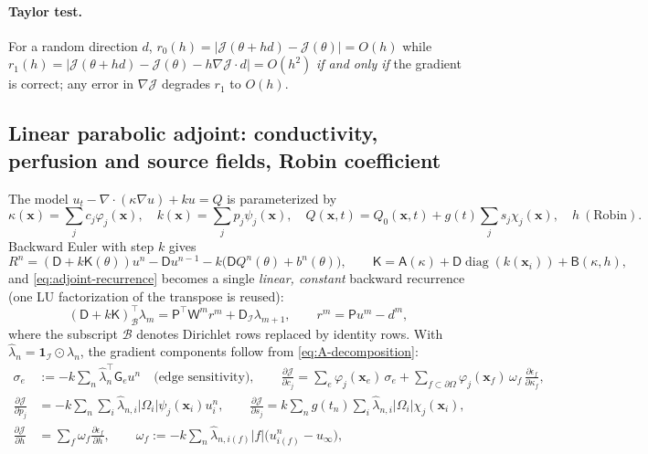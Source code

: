 \documentclass[11pt]{article}
\numberwithin{equation}{section}
\theoremstyle{remark}
\newcommand{\Dm}{\mathsf{D}}           %
\newcommand{\K}{\mathsf{K}}
\newcommand{\Pobs}{\mathsf{P}}
\begin{document}
\paragraph{Taylor test.}  For a random direction $d$,
$r_0(h)=|\mathcal J(\theta+hd)-\mathcal J(\theta)|=O(h)$ while
$r_1(h)=|\mathcal J(\theta+hd)-\mathcal J(\theta)-h\nabla\mathcal J\cdot d|=O(h^2)$
\emph{if and only if} the gradient is correct; any error in $\nabla\mathcal J$
degrades $r_1$ to $O(h)$.

\subsection{Linear parabolic adjoint: conductivity, perfusion and source fields, Robin coefficient}
\label{sec:linear-adjoint}

The model $u_t-\nabla\cdot(\kappa\nabla u)+ku=Q$ is parameterized by
\begin{equation}
  \kappa(\bm x)=\sum_{j}c_j\varphi_j(\bm x),\quad
  k(\bm x)=\sum_j p_j\psi_j(\bm x),\quad
  Q(\bm x,t)=Q_0(\bm x,t)+g(t)\sum_j s_j\chi_j(\bm x),\quad h\ (\text{Robin}).
\end{equation}
Backward Euler with step $k$ gives
\begin{equation}
  R^n = (\Dm+k\K(\theta))u^n-\Dm u^{n-1}-k\big(\Dm Q^n(\theta)+b^n(\theta)\big),
  \qquad \K = \mathsf A(\kappa)+\Dm\operatorname{diag}(k(\bm x_i))+\mathsf B(\kappa,h),
\end{equation}
and \eqref{eq:adjoint-recurrence} becomes a single \emph{linear, constant}
backward recurrence (one LU factorization of the transpose is reused):
\begin{equation}
  (\Dm+k\K)^{\!\top}_{\mathcal B}\lambda_m = \Pobs^{\!\top}\mathsf W^m r^m + \Dm_{\mathcal I}\lambda_{m+1},
  \qquad r^m=\Pobs u^m-d^m,
\end{equation}
where the subscript $\mathcal B$ denotes Dirichlet rows replaced by identity rows.
With $\hat\lambda_n=\mathbf 1_{\mathcal I}\odot\lambda_n$, the gradient
components follow from \eqref{eq:A-decomposition}:
\begin{align}
  \sigma_e &:= -k\sum_{n}\hat\lambda_n^{\!\top}\mathsf G_e u^n
  \quad\text{(edge sensitivity)},\qquad
  \frac{\partial\mathcal J}{\partial c_j} = \sum_{e}\varphi_j(\bm x_e)\,\sigma_e
  + \sum_{f\subset\partial\Omega}\varphi_j(\bm x_f)\,\omega_f\,\frac{\partial\epsilon_f}{\partial\kappa_f},
  \label{eq:edge-sensitivity}\\
  \frac{\partial\mathcal J}{\partial p_j} &= -k\sum_n\sum_i \hat\lambda_{n,i}|\Omega_i|\psi_j(\bm x_i)u_i^n,
  \qquad
  \frac{\partial\mathcal J}{\partial s_j} = k\sum_n g(t_n)\sum_i\hat\lambda_{n,i}|\Omega_i|\chi_j(\bm x_i),\\
  \frac{\partial\mathcal J}{\partial h} &= \sum_f \omega_f\frac{\partial\epsilon_f}{\partial h},
  \qquad
  \omega_f := -k\sum_n\hat\lambda_{n,i(f)}|f|\big(u^n_{i(f)}-u_\infty\big),
\end{align}
\end{document}
